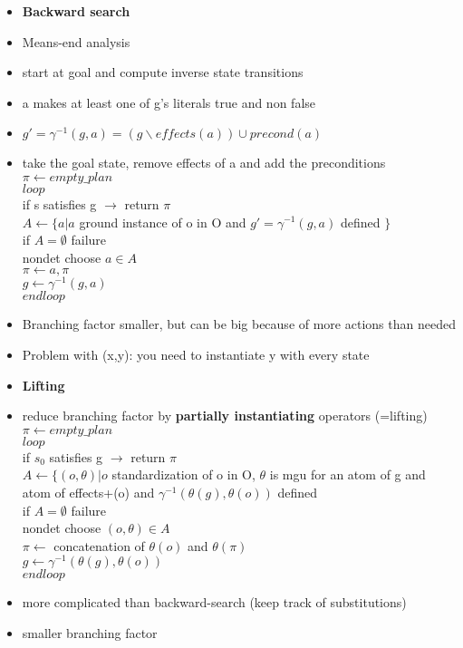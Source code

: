 \begin{itemize}
\item \textbf{Backward search}
\item Means-end analysis
\item start at goal and compute inverse state transitions 
\item a makes at least one of g's literals true and non false
\item $g' = \gamma^{-1}(g,a) = (g\backslash effects(a)) \cup precond(a)$
\item take the goal state, remove effects of a and add the preconditions
\\
$\pi \leftarrow empty\_plan$\\
$loop$\\
if s satisfies g $\rightarrow$ return $\pi$\\
$A \leftarrow \{ a|a$ ground instance of o in O and $g' = \gamma^{-1}(g,a)$ defined $\}$\\
if $A=\emptyset$ failure \\
nondet choose $a \in A$ \\
$\pi \leftarrow a,\pi$ \\
$g \leftarrow \gamma^{-1}(g,a)$ \\
$endloop$
\item Branching factor smaller, but can be big because of more actions than needed
\item Problem with (x,y): you need to instantiate y with every state

\item \textbf{Lifting}
\item reduce branching factor by \textbf{partially instantiating} operators (=lifting)
\\
$\pi \leftarrow empty\_plan$\\
$loop$\\
if $s_0$ satisfies g $\rightarrow$ return $\pi$\\
$A \leftarrow \{ (o,\theta)|o$ standardization of o in O, 
$\theta$ is mgu for an atom of g and atom of effects+(o) and 
$\gamma^{-1}(\theta(g),\theta(o))$ defined\\
if $A=\emptyset$ failure \\
nondet choose $(o,\theta) \in A$ \\
$\pi \leftarrow$ concatenation of $\theta(o)$ and $\theta(\pi)$ \\
$g \leftarrow \gamma^{-1}(\theta(g),\theta(o))$ \\
$endloop$
\\
\item more complicated than backward-search (keep track of substitutions)
\item smaller branching factor


\end{itemize}
